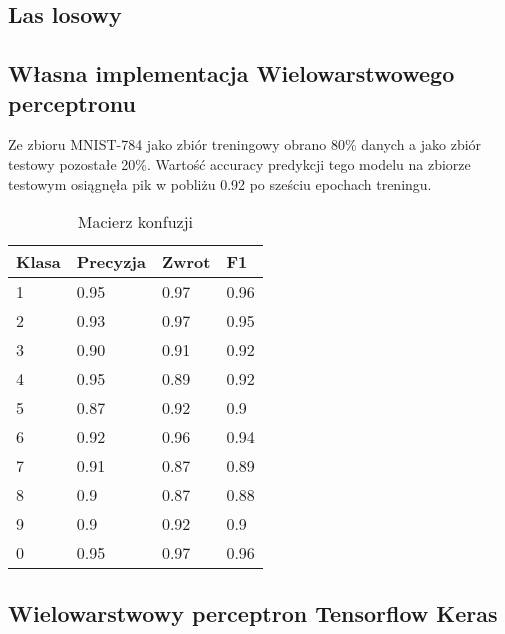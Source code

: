\documentclass{article}
\begin{document}
\subsection{Las losowy}
\subsection{Własna implementacja Wielowarstwowego perceptronu}

Ze zbioru MNIST-784 jako zbiór treningowy obrano 80\% danych a 
jako zbiór testowy pozostałe 20\%. Wartość accuracy predykcji tego modelu na zbiorze testowym osiągnęła
pik w pobliżu 0.92 po sześciu epochach treningu.

\begin{table}[H]
    \centering
    \begin{tabular}{|l|l|l|l|}
    \hline
    Klasa & Precyzja & Zwrot & F1   \\
    \hline
    1     & 0.95     & 0.97  & 0.96 \\
    2     & 0.93     & 0.97  & 0.95 \\
    3     & 0.90     & 0.91  & 0.92 \\
    4     & 0.95     & 0.89  & 0.92 \\
    5     & 0.87     & 0.92  & 0.9  \\
    6     & 0.92     & 0.96  & 0.94 \\
    7     & 0.91     & 0.87  & 0.89 \\
    8     & 0.9      & 0.87  & 0.88 \\
    9     & 0.9      & 0.92  & 0.9  \\
    0     & 0.95     & 0.97  & 0.96 \\
    \hline
    \end{tabular}
    \caption{Macierz konfuzji}
\end{table}
    
\subsection{Wielowarstwowy perceptron Tensorflow Keras}
\end{document}
